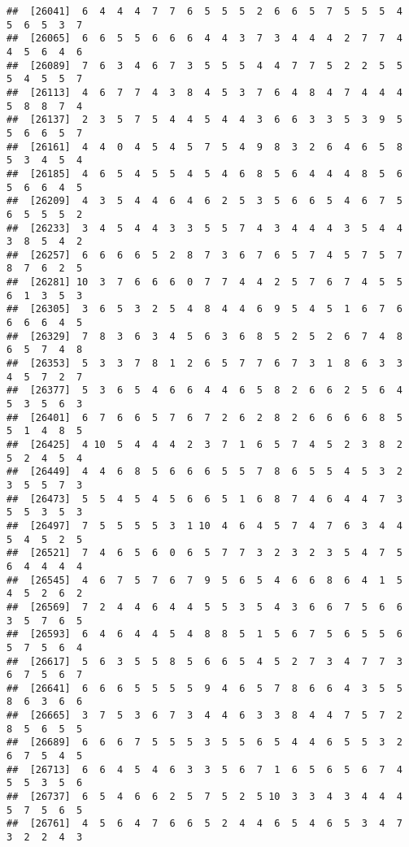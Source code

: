 \documentclass[
]{book}
\begin{document}
\begin{verbatim}
##  [26041]  6  4  4  4  7  7  6  5  5  5  2  6  6  5  7  5  5  5  4  5  6  5  3  7
##  [26065]  6  6  5  5  6  6  6  4  4  3  7  3  4  4  4  2  7  7  4  4  5  6  4  6
##  [26089]  7  6  3  4  6  7  3  5  5  5  4  4  7  7  5  2  2  5  5  5  4  5  5  7
##  [26113]  4  6  7  7  4  3  8  4  5  3  7  6  4  8  4  7  4  4  4  5  8  8  7  4
##  [26137]  2  3  5  7  5  4  4  5  4  4  3  6  6  3  3  5  3  9  5  5  6  6  5  7
##  [26161]  4  4  0  4  5  4  5  7  5  4  9  8  3  2  6  4  6  5  8  5  3  4  5  4
##  [26185]  4  6  5  4  5  5  4  5  4  6  8  5  6  4  4  4  8  5  6  5  6  6  4  5
##  [26209]  4  3  5  4  4  6  4  6  2  5  3  5  6  6  5  4  6  7  5  6  5  5  5  2
##  [26233]  3  4  5  4  4  3  3  5  5  7  4  3  4  4  4  3  5  4  4  3  8  5  4  2
##  [26257]  6  6  6  6  5  2  8  7  3  6  7  6  5  7  4  5  7  5  7  8  7  6  2  5
##  [26281] 10  3  7  6  6  6  0  7  7  4  4  2  5  7  6  7  4  5  5  6  1  3  5  3
##  [26305]  3  6  5  3  2  5  4  8  4  4  6  9  5  4  5  1  6  7  6  6  6  6  4  5
##  [26329]  7  8  3  6  3  4  5  6  3  6  8  5  2  5  2  6  7  4  8  6  5  7  4  8
##  [26353]  5  3  3  7  8  1  2  6  5  7  7  6  7  3  1  8  6  3  3  4  5  7  2  7
##  [26377]  5  3  6  5  4  6  6  4  4  6  5  8  2  6  6  2  5  6  4  5  3  5  6  3
##  [26401]  6  7  6  6  5  7  6  7  2  6  2  8  2  6  6  6  6  8  5  5  1  4  8  5
##  [26425]  4 10  5  4  4  4  2  3  7  1  6  5  7  4  5  2  3  8  2  5  2  4  5  4
##  [26449]  4  4  6  8  5  6  6  6  5  5  7  8  6  5  5  4  5  3  2  3  5  5  7  3
##  [26473]  5  5  4  5  4  5  6  6  5  1  6  8  7  4  6  4  4  7  3  5  5  3  5  3
##  [26497]  7  5  5  5  5  3  1 10  4  6  4  5  7  4  7  6  3  4  4  5  4  5  2  5
##  [26521]  7  4  6  5  6  0  6  5  7  7  3  2  3  2  3  5  4  7  5  6  4  4  4  4
##  [26545]  4  6  7  5  7  6  7  9  5  6  5  4  6  6  8  6  4  1  5  4  5  2  6  2
##  [26569]  7  2  4  4  6  4  4  5  5  3  5  4  3  6  6  7  5  6  6  3  5  7  6  5
##  [26593]  6  4  6  4  4  5  4  8  8  5  1  5  6  7  5  6  5  5  6  5  7  5  6  4
##  [26617]  5  6  3  5  5  8  5  6  6  5  4  5  2  7  3  4  7  7  3  6  7  5  6  7
##  [26641]  6  6  6  5  5  5  5  9  4  6  5  7  8  6  6  4  3  5  5  8  6  3  6  6
##  [26665]  3  7  5  3  6  7  3  4  4  6  3  3  8  4  4  7  5  7  2  8  5  6  5  5
##  [26689]  6  6  6  7  5  5  5  3  5  5  6  5  4  4  6  5  5  3  2  6  7  5  4  5
##  [26713]  6  6  4  5  4  6  3  3  5  6  7  1  6  5  6  5  6  7  4  5  5  3  5  6
##  [26737]  6  5  4  6  6  2  5  7  5  2  5 10  3  3  4  3  4  4  4  5  7  5  6  5
##  [26761]  4  5  6  4  7  6  6  5  2  4  4  6  5  4  6  5  3  4  7  3  2  2  4  3

\end{verbatim}
\end{document}

